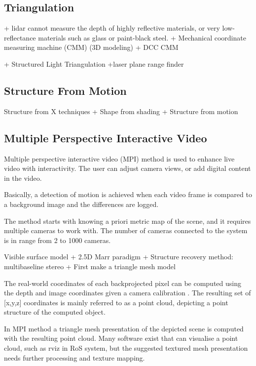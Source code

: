 \documentclass[12pt,a4paper,oneside,pdftex]{report}
\begin{document}
{\subsection{Triangulation}
\label{subsection:triangulation}



+ lidar cannot measure the depth of highly reflective materials, or very low-reflectance materials such as glass or paint-black steel.
+ Mechanical coordinate measuring machine (CMM) (3D modeling)
    + DCC CMM

+ Structured Light Triangulation
    +laser plane range finder

\subsection{Structure From Motion}
\label{subsection:structure_from_motion}

Structure from X techniques
+ Shape from shading
+ Structure from motion

\subsection{Multiple Perspective Interactive Video}

Multiple perspective interactive video (MPI) method is used to enhance live video with interactivity. The user can adjust camera views, or add digital content in the video. 

Basically, a detection of motion is achieved when each video frame is compared to a background image and the differences are logged. 

The method starts with knowing a priori metric map of the scene, and it requires multiple cameras to work with. The number of cameras connected to the system is in range from 2 to 1000 cameras.

Visible surface model
+ 2.5D Marr paradigm
+ Structure recovery method: multibaseline stereo
+ First make a triangle mesh model 

The real-world coordinates of each backprojected pixel can be computed using the depth and image coordinates given a camera calibration \cite{Rander97}. The resulting set of [x,y,z] coordinates is mainly referred to as a point cloud, depicting a point structure of the computed object.

In MPI method a triangle mesh presentation of the depicted scene is computed with the resulting point cloud. Many software exist that can visualise a point cloud, such as rviz in RoS system, but the suggested textured mesh presentation needs further processing and texture mapping. 

}
\end{document}
